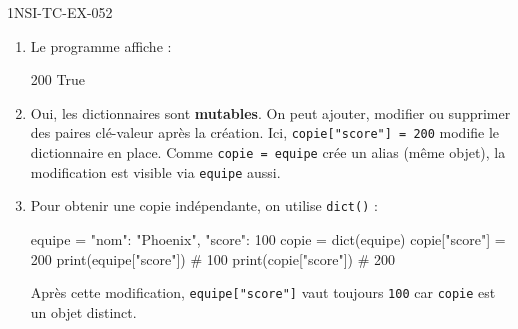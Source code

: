 \begin{corrige}{1NSI-TC-EX-052}
\begin{enumerate}
  \item Le programme affiche :
\begin{console}
200
True
\end{console}

  \item Oui, les dictionnaires sont \textbf{mutables}. On peut ajouter, modifier ou supprimer des paires clé-valeur après la création. Ici, \lstinline{copie["score"] = 200} modifie le dictionnaire en place. Comme \lstinline{copie = equipe} crée un alias (même objet), la modification est visible via \lstinline{equipe} aussi.

  \item Pour obtenir une copie indépendante, on utilise \lstinline{dict()} :
\begin{python}
equipe = {"nom": "Phoenix", "score": 100}
copie = dict(equipe)
copie["score"] = 200
print(equipe["score"])  # 100
print(copie["score"])   # 200
\end{python}
Après cette modification, \lstinline{equipe["score"]} vaut toujours \lstinline{100} car \lstinline{copie} est un objet distinct.
\end{enumerate}
\end{corrige}
